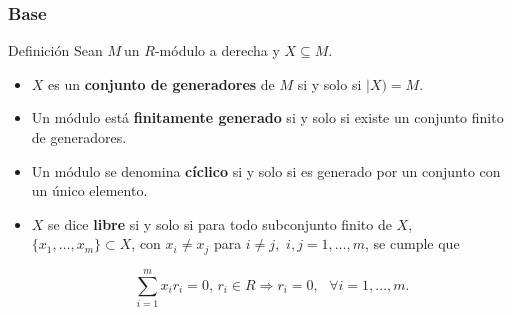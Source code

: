 \documentclass[notes=show]{beamer}%
\newenvironment{Defi}{\begin{block}{Definición}}{\end{block}}
\begin{document}
\begin{frame}%


\bigskip%
\frametitle{Base}%


\begin{Defi}
\bigskip Sean $M~$un $R$-módulo a derecha y $X\subseteq M$.

\begin{itemize}
\item $X$ es un \textbf{conjunto de generadores }de $M$ si y solo si $|X)=M$.

\item Un módulo está \textbf{finitamente generado} si y solo si existe
un conjunto finito de generadores.

\item Un módulo se denomina \textbf{cíclico} si y solo si es generado
por un conjunto con un único elemento.

\item $X$ se dice \textbf{libre }si y solo si para todo subconjunto finito de
$X$, $\{x_{1},\ldots,x_{m}\}\subset X$, con $x_{i}\neq x_{j}$ para $i\neq j,$
$i,j=1,\ldots,m$, se cumple que%

\[%
{\displaystyle\sum\limits_{i=1}^{m}}
x_{i}r_{i}=0\text{, }r_{i}\in R\Rightarrow r_{i}=0,\text{ }\forall
i=1,\ldots,m\text{.}%
\]

\end{itemize}
\end{Defi}

\bigskip

\bigskip%

\transboxout
\end{frame}%


\bigskip%
\end{document}
